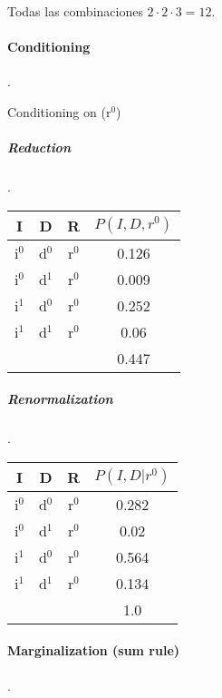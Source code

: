  Todas las combinaciones $2\cdot2\cdot3 = 12$.
 

 
 \paragraph{Conditioning} .

 Conditioning on (r$^0$)

 \subparagraph{Reduction} .
 
 \begin{tabular}{|c|c|c|c|}
 \hline
 I & D & R & $P(I,D,r^0)$ \\ \hline
 i$^0$ & d$^0$ & r$^0$ & 0.126 \\ \hline
 i$^0$ & d$^1$ & r$^0$ & 0.009 \\ \hline
 i$^1$ & d$^0$ & r$^0$ & 0.252 \\ \hline
 i$^1$ & d$^1$ & r$^0$ & 0.06 \\ \hline
       &       &       & 0.447     \\ \hline
 \end{tabular}
 


 \subparagraph{Renormalization} .
 
 \begin{tabular}{|c|c|c|c|}
 \hline
 I & D & R & $P(I,D|r^0)$ \\ \hline
 i$^0$ & d$^0$ & r$^0$ & 0.282 \\ \hline
 i$^0$ & d$^1$ & r$^0$ & 0.02 \\ \hline
 i$^1$ & d$^0$ & r$^0$ & 0.564 \\ \hline
 i$^1$ & d$^1$ & r$^0$ & 0.134\\ \hline
       &       &       & 1.0     \\ \hline
 \end{tabular}

\paragraph{Marginalization (sum rule)} .

